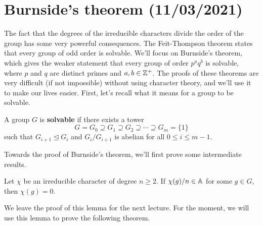 \section{Burnside's theorem (11/03/2021)} 
The fact that the degrees of the irreducible characters divide the order of 
the group has some very powerful consequences. The Feit-Thompson theorem 
states that every group of odd order is solvable. We'll focus on Burnside's 
theorem, which gives the weaker statement that every group of order 
$p^a q^b$ is solvable, where $p$ and $q$ are distinct primes and $a, b \in \mathbb{Z}^+$. 
The proofs of these theorems are very difficult (if not impossible) without 
using character theory, and we'll use it to make our lives easier. 
First, let's recall what it means for a group to be solvable. 

\begin{defn}{}
    A group $G$ is {\bf solvable} if there exists a tower 
    \[ G = G_0 \supseteq G_1 \supseteq G_2 \supseteq \cdots \supseteq G_m = \{1\} \] 
    such that $G_{i+1} \trianglelefteq G_i$ and $G_i/G_{i+1}$ is abelian for 
    all $0 \leq i \leq m-1$. 
\end{defn}

Towards the proof of Burnside's theorem, we'll first prove some intermediate results. 

\begin{lemma}{}
    Let $\chi$ be an irreducible character of degree $n \geq 2$. If $\chi(g)/n 
    \in \mathbb{A}$ for some $g \in G$, then $\chi(g) = 0$. 
\end{lemma}

We leave the proof of this lemma for the next lecture. For the moment, we 
will use this lemma to prove the following theorem. 

